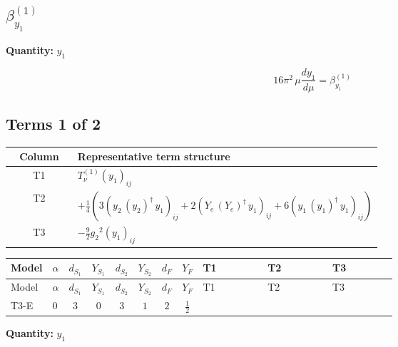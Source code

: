 \documentclass[8pt]{article}
\begin{document}
\begin{landscape}
\section*{$\beta_{y_1}^{(1)}$}
\noindent\textbf{Quantity: }$y_1$\par\smallskip
\[16\pi^2\,\mu\frac{d y_1}{d\mu}=\beta_{y_1}^{(1)}\]
\subsection*{Terms 1 of 2}
\begin{center}
\begin{tabular}{@{}c >{\raggedright\arraybackslash}p{0.82\linewidth}@{}}
\toprule
Column & Representative term structure \\
\midrule
T1 & \(\displaystyle T_{\nu}^{(1)} \left({y_1}\right)_{ij}\) \\
\midrule
T2 & \(\displaystyle +\frac{1}{4} (3 \left({y_2}\,\left({y_2}\right)^{\dagger}\,{y_1}\right)_{ij}+2 \left({Y_e}\,\left({Y_e}\right)^{\dagger}\,{y_1}\right)_{ij}+6 \left({y_1}\,\left({y_1}\right)^{\dagger}\,{y_1}\right)_{ij})\) \\
\midrule
T3 & \(\displaystyle -\frac{9}{2} {g_2}^2 \left({y_1}\right)_{ij}\) \\
\midrule
\bottomrule
\end{tabular}
\end{center}
\smallskip
\tiny
\begin{longtable}{@{}llcccccc >{\raggedright\arraybackslash}p{0.21\linewidth} >{\raggedright\arraybackslash}p{0.21\linewidth} >{\raggedright\arraybackslash}p{0.21\linewidth}@{}}
\toprule
Model & $\alpha$ & $d_{S_1}$ & $Y_{S_1}$ & $d_{S_2}$ & $Y_{S_2}$ & $d_F$ & $Y_F$ & T1 & T2 & T3 \\
\midrule
\endfirsthead
\toprule
Model & $\alpha$ & $d_{S_1}$ & $Y_{S_1}$ & $d_{S_2}$ & $Y_{S_2}$ & $d_F$ & $Y_F$ & T1 & T2 & T3 \\
\midrule
\endhead
T3-E & $0$ & $3$ & $0$ & $3$ & $1$ & $2$ & $\frac{1}{2}$ & \scriptsize\adjustbox{max width=\linewidth}{$\begin{gathered} T_{\nu}^{(1)} \left({y_1}\right)_{ij}\end{gathered}$} & \scriptsize\adjustbox{max width=\linewidth}{$\begin{gathered} +\frac{1}{4} (3 \left({y_2}\,\left({y_2}\right)^{\dagger}\,{y_1}\right)_{ij}+2 \left({Y_e}\,\left({Y_e}\right)^{\dagger}\,{y_1}\right)_{ij}+6 \left({y_1}\,\left({y_1}\right)^{\dagger}\,{y_1}\right)_{ij})\end{gathered}$} & \scriptsize\adjustbox{max width=\linewidth}{$\begin{gathered} -\frac{9}{2} {g_2}^2 \left({y_1}\right)_{ij}\end{gathered}$} \\
\midrule
\bottomrule
\end{longtable}
\clearpage
\noindent\textbf{Quantity: }$y_1$\par\smallskip

\end{landscape}
\end{document}
